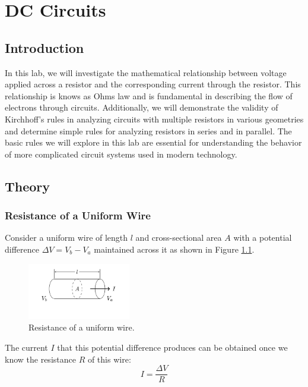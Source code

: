 \chapter{DC Circuits}

\section{Introduction}

In this lab, we will investigate the mathematical relationship between voltage applied across a resistor and the corresponding current through the resistor. This relationship is knows as Ohms law and is fundamental in describing the flow of electrons through circuits. Additionally, we will demonstrate the validity of Kirchhoff's rules in analyzing circuits with multiple resistors in various geometries and determine simple rules for analyzing resistors in series and in parallel. The basic rules we will explore in this lab are essential for understanding the behavior of more complicated circuit systems used in modern technology.

\section{Theory}
\subsection{Resistance of a Uniform Wire}

Consider a uniform wire of length $l$ and cross-sectional area $A$ with a potential difference $\Delta V = V_b - V_a$ maintained across it as shown in Figure \ref{fig:cross-sec}.\myskip

\begin{figure}[h]
\centering
\includegraphics[width=0.4\textwidth]{./Exp2/pic/wireresistance.png}
\caption{Resistance of a uniform wire.}
\label{fig:cross-sec}
\end{figure}

The current $I$ that this potential difference produces can be obtained once we know the resistance $R$ of this wire:
\begin{equation}
	I = \frac{\Delta V}{R}
\end{equation}

